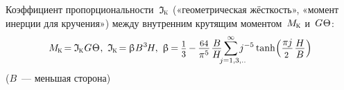 \documentclass[14pt]{extarticle}
\newcommand{\lquote}[0]{«} %
\newcommand{\rquote}[0]{»} %
\newcommand{\inquotes}[1]{\lquote{#1}\rquote}
\begin{document}
\hspace*{-\parindent}%
\begin{minipage}{\linewidth}

\hspace{\savedparindent}
Коэффициент пропорциональности~${\mathfrak{I}_{\hspace{-0.1ex}\mathrm{\scalebox{.6}{K}}}}$ (\inquotes{геометрическая жёсткость}, \inquotes{момент инерции для кручения}) между внутренним крутящим моментом~${M_{\hspace{-0.1ex}\mathrm{\scalebox{.6}{K}}}}$ и~${G \hspace{.1ex} \Theta}$:
\[
M_{\hspace{-0.1ex}\mathrm{\scalebox{.6}{K}}} \hspace{-0.3ex}=\hspace{-0.1ex}
\mathfrak{I}_{\hspace{-0.1ex}\mathrm{\scalebox{.6}{K}}} \hspace{.1ex} G \hspace{.1ex} \Theta
\hspace{.1ex} , \hspace{.33em}
\mathfrak{I}_{\hspace{-0.1ex}\mathrm{\scalebox{.6}{K}}} \hspace{-0.3ex}=\hspace{-0.1ex}
\upbeta B^{\hspace{.1ex}3} \hspace{-0.2ex} H
, \hspace{.33em}
%
\upbeta \hspace{-0.2ex}=\hspace{-0.1ex}
\scalebox{.88}{$\displaystyle\frac{\raisebox{-0.18em}{$1$}}{3}$}
\hspace{-0.1ex}-\hspace{-0.1ex} \displaystyle\frac{\raisebox{-0.18em}{\scalebox{.88}{$64$}}}{\pi^5} \hspace{.2ex} \displaystyle\frac{\raisebox{-0.2em}{$B$}}{H} \displaystyle\sum_{\mathclap{\hspace{.4em}j=1,3,..}}^{\raisebox{-0.1em}{\scalebox{.75}{$\infty$}}} j^{-5} \operatorname{tanh} \hspace{-0.33ex} \left( \displaystyle\frac{\raisebox{-0.18em}{$\pi \hspace{-0.1ex} j$}}{\scalebox{.88}{$2$}} \hspace{.2ex} \displaystyle\frac{\raisebox{-0.2em}{$H$}}{B} \hspace{.1ex} \right)
\vspace{-.6em}\]
($B$~--- меньшая сторона)

\end{minipage}
\vspace{.5em}
\end{document}
